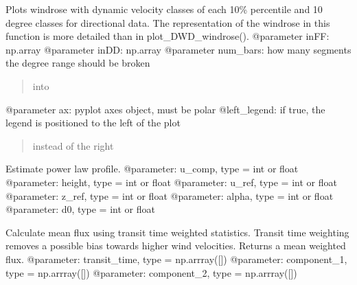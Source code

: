 \documentclass[letterpaper,10pt,english]{sphinxmanual}
\begin{document}
\begin{fulllineitems}
\label{\detokenize{index:windtunnel.plot_windrose}}
Plots windrose with dynamic velocity classes of each 10\% percentile and
10 degree classes for directional data. The representation of the windrose 
in this function is more detailed than in plot\_DWD\_windrose().
@parameter inFF: np.array
@parameter inDD: np.array
@parameter num\_bars: how many segments the degree range should be broken
\begin{quote}

into
\end{quote}

@parameter ax: pyplot axes object, must be polar
@left\_legend: if true, the legend is positioned to the left of the plot
\begin{quote}

instead of the right
\end{quote}

\end{fulllineitems}


\begin{fulllineitems}
\label{\detokenize{index:windtunnel.power_law}}
Estimate power law profile.
@parameter: u\_comp, type = int or float
@parameter: height, type = int or float
@parameter: u\_ref, type = int or float
@parameter: z\_ref, type = int or float
@parameter: alpha, type = int or float
@parameter: d0, type = int or float

\end{fulllineitems}


\begin{fulllineitems}
\label{\detokenize{index:windtunnel.transit_time_weighted_flux}}
Calculate mean flux using transit time weighted statistics. Transit
time weighting removes a possible bias towards higher wind velocities.
Returns a mean weighted flux.
@parameter: transit\_time, type = np.arrray({[}{]})
@parameter: component\_1,  type = np.arrray({[}{]})
@parameter: component\_2,  type = np.arrray({[}{]})

\end{fulllineitems}
\end{document}
